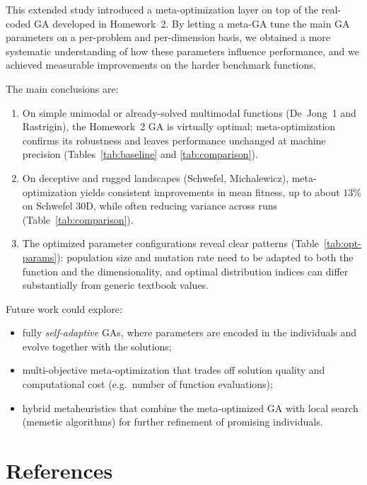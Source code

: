\documentclass[11pt]{article}
\begin{document}
This extended study introduced a meta-optimization layer on top of the real-coded
GA developed in Homework~2.
By letting a meta-GA tune the main GA parameters on a per-problem and
per-dimension basis, we obtained a more systematic understanding of how
these parameters influence performance, and we achieved measurable
improvements on the harder benchmark functions.

The main conclusions are:
\begin{enumerate}
  \item On simple unimodal or already-solved multimodal functions
        (De~Jong~1 and Rastrigin), the Homework~2 GA is virtually
        optimal; meta-optimization confirms its robustness and leaves
        performance unchanged at machine precision
        (Tables~\ref{tab:baseline} and \ref{tab:comparison}).
  \item On deceptive and rugged landscapes (Schwefel, Michalewicz),
        meta-optimization yields consistent improvements in mean fitness,
        up to about $13\%$ on Schwefel 30D, while often reducing
        variance across runs (Table~\ref{tab:comparison}).
  \item The optimized parameter configurations reveal clear patterns
        (Table~\ref{tab:opt-params}):
        population size and mutation rate need to be adapted to both
        the function and the dimensionality, and optimal distribution
        indices can differ substantially from generic textbook values.
\end{enumerate}

Future work could explore:
\begin{itemize}
  \item fully \emph{self-adaptive} GAs, where parameters are encoded in
        the individuals and evolve together with the solutions;
  \item multi-objective meta-optimization that trades off solution quality
        and computational cost (e.g.\ number of function evaluations);
  \item hybrid metaheuristics that combine the meta-optimized GA with
        local search (memetic algorithms) for further refinement of
        promising individuals.
\end{itemize}

\section*{References}
\end{document}
